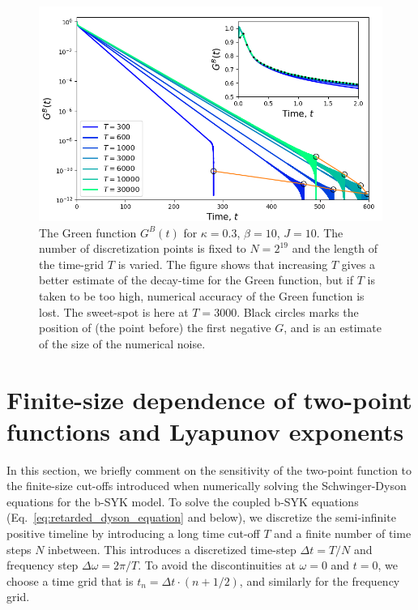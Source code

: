 \begin{figure}[h]
	\centering
	\includegraphics[width=1.0\columnwidth]{figures/chapter1/FiniteSizeAnalysis.png}
	\caption{The Green function $G^B(t)$ for $\kappa=0.3$, $\beta=10$, $J=10$. 
		The number of discretization points is fixed to $N=2^{19}$ and the length of the time-grid $T$ is varied.
		The figure shows that increasing $T$ gives a better estimate of the decay-time for the Green function, but if $T$ is taken to be too high, numerical accuracy of the Green function is lost. The sweet-spot is here at $T=3000$.
		Black circles marks the position of (the point before) the first negative $G$, and is an estimate of the size of the numerical noise.     
	}
	\label{fig:FiniteSize}
\end{figure}



\section{Finite-size dependence of two-point functions and Lyapunov exponents}\label{app:FiniteSize}
In this section, we briefly comment on the sensitivity of the two-point function to the finite-size cut-offs introduced when numerically solving the Schwinger-Dyson equations for the b-SYK model.
To solve the coupled b-SYK equations (Eq.~\eqref{eq:retarded_dyson_equation} and below), we discretize the semi-infinite positive timeline by introducing a long time cut-off $T$ and a finite number of time steps $N$ inbetween. 
This introduces a discretized time-step $\Delta t=T/N$ and frequency step $\Delta \omega = 2 \pi / T$.
To avoid the discontinuities at $\omega=0$ and $t = 0$, we choose a time grid that is $t_n = \Delta t \cdot (n+1/2)$, and similarly for the frequency grid.

